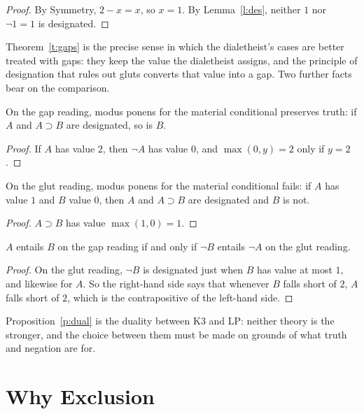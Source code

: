 \documentclass{situationist-preprint}
\begin{document}
\begin{proof}
By Symmetry, $2 - x = x$, so $x = 1$. By Lemma~\ref{l:des}, neither $1$ nor $\neg 1 = 1$ is designated.
\end{proof}

Theorem~\ref{t:gaps} is the precise sense in which the dialetheist's cases are better treated with gaps: they keep the value the dialetheist assigns, and the principle of designation that rules out gluts converts that value into a gap. Two further facts bear on the comparison.

\begin{proposition}\label{p:mpgap}
On the gap reading, modus ponens for the material conditional preserves truth: if $A$ and $A \supset B$ are designated, so is $B$.
\end{proposition}

\begin{proof}
If $A$ has value $2$, then $\neg A$ has value $0$, and $\max(0, y) = 2$ only if $y = 2$.
\end{proof}

\begin{proposition}\label{p:mplp}
On the glut reading, modus ponens for the material conditional fails: if $A$ has value $1$ and $B$ value $0$, then $A$ and $A \supset B$ are designated and $B$ is not.
\end{proposition}

\begin{proof}
$A \supset B$ has value $\max(1, 0) = 1$.
\end{proof}

\begin{proposition}\label{p:dual}
$A$ entails $B$ on the gap reading if and only if $\neg B$ entails $\neg A$ on the glut reading.
\end{proposition}

\begin{proof}
On the glut reading, $\neg B$ is designated just when $B$ has value at most $1$, and likewise for $A$. So the right-hand side says that whenever $B$ falls short of $2$, $A$ falls short of $2$, which is the contrapositive of the left-hand side.
\end{proof}

Proposition~\ref{p:dual} is the duality between K3 and LP: neither theory is the stronger, and the choice between them must be made on grounds of what truth and negation are for.

\section{Why Exclusion}\label{s:excl}
\end{document}
